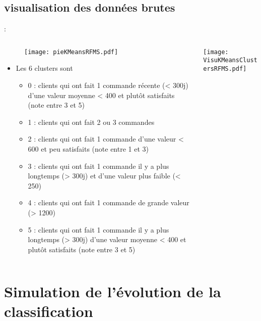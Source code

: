 \documentclass[8pt,aspectratio=169,hyperref={unicode=true}]{beamer}
\begin{document}
\subsection{visualisation des données brutes}
\begin{frame}{\insertsection: \insertsubsection}
    \begin{columns}
        \begin{column}{.5\textwidth}
            \begin{figure}
                \texttt{[image: pieKMeansRFMS.pdf]}
            \end{figure}
            \begin{itemize}
                \footnotesize
                \item Les 6 clusters sont
                      \begin{itemize}
                          \scriptsize
                          \item 0 : clients qui ont fait 1 commande récente (< 300j) d'une valeur moyenne < 400 et plutôt satisfaits (note entre 3 et 5)
                          \item 1 : clients qui ont fait 2 ou 3 commandes
                          \item 2 : clients qui ont fait 1 commande d'une valeur < 600 et peu satisfaits (note entre 1 et 3)
                          \item 3 : clients qui ont fait 1 commande il y a plus longtemps (> 300j) et d'une valeur plus faible (< 250)
                          \item 4 : clients qui ont fait 1 commande de grande valeur (> 1200)
                          \item 5 : clients qui ont fait 1 commande il y a plus longtemps (> 300j) d'une valeur moyenne < 400 et plutôt satisfaits (note entre 3 et 5)
                      \end{itemize}
            \end{itemize}
        \end{column}
        \begin{column}{.5\textwidth}
            \texttt{[image: VisuKMeansClustersRFMS.pdf]}
        \end{column}
    \end{columns}
\end{frame}

\section{Simulation de l'évolution de la classification}
\end{document}
